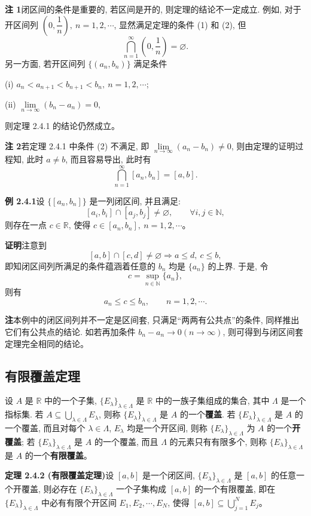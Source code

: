 \documentclass[UTF8,12pt,a4paper,fontset=fandol]{ctexart}
\begin{document}
\noindent\textbf{注 1}\quad 闭区间的条件是重要的, 若区间是开的, 则定理的结论不一定成立. 例如, 对于开区间列 $\left(0,\dfrac1n\right),\ n=1,2,\cdots$, 显然满足定理的条件 (1) 和 (2), 但
\[
  \bigcap_{n=1}^\infty\left(0,\frac1n\right)=\varnothing.
\]
另一方面, 若开区间列 $\{(a_n,b_n)\}$ 满足条件

(i) $a_n<a_{n+1}<b_{n+1}<b_n,\ n=1,2,\cdots$;

(ii) $\lim\limits_{n\to\infty}(b_n-a_n)=0$,

则定理 2.4.1 的结论仍然成立。

\noindent\textbf{注 2}\quad 若定理 2.4.1 中条件 (2) 不满足, 即 $\lim\limits_{n\to\infty}(a_n-b_n)\ne0$, 则由定理的证明过程知, 此时 $a\ne b$, 而且容易导出, 此时有
\[
  \bigcap_{n=1}^\infty [a_n,b_n]=[a,b].
\]

\noindent\textbf{例 2.4.1}\quad 设 $\{[a_n,b_n]\}$ 是一列闭区间, 并且满足:
\[
  [a_i,b_i]\cap[a_j,b_j]\ne\varnothing,\qquad \forall i,j\in\mathbb{N},
\]
则存在一点 $c\in\mathbb{R}$, 使得 $c\in[a_n,b_n],\ n=1,2,\cdots$。

\noindent\textbf{证明}\quad 注意到
\[
  [a,b]\cap[c,d]\ne\varnothing\Rightarrow a\leqslant d,\ c\leqslant b,
\]
即知闭区间列所满足的条件蕴涵着任意的 $b_n$ 均是 $\{a_n\}$ 的上界. 于是, 令
\[
  c=\sup_{n\in\mathbb{N}}\{a_n\},
\]
则有
\[
  a_n\leqslant c\leqslant b_n,\qquad n=1,2,\cdots .
\]

\noindent\textbf{注}\quad 本例中的闭区间列并不一定是区间套, 只满足``两两有公共点''的条件, 同样推出它们有公共点的结论. 如若再加条件 $b_n-a_n\to0(n\to\infty)$, 则可得到与闭区间套定理完全相同的结论。

\subsection{有限覆盖定理}

设 $A$ 是 $\mathbb{R}$ 中的一个子集, $\{E_\lambda\}_{\lambda\in\Lambda}$ 是 $\mathbb{R}$ 中的一族子集组成的集合, 其中 $\Lambda$ 是一个指标集. 若 $A\subseteq\bigcup_{\lambda\in\Lambda}E_\lambda$, 则称 $\{E_\lambda\}_{\lambda\in\Lambda}$ 是 $A$ 的一个\textbf{覆盖}. 若 $\{E_\lambda\}_{\lambda\in\Lambda}$ 是 $A$ 的一个覆盖, 而且对每个 $\lambda\in\Lambda$, $E_\lambda$ 均是一个开区间, 则称 $\{E_\lambda\}_{\lambda\in\Lambda}$ 为 $A$ 的一个\textbf{开覆盖}; 若 $\{E_\lambda\}_{\lambda\in\Lambda}$ 是 $A$ 的一个覆盖, 而且 $\Lambda$ 的元素只有有限多个, 则称 $\{E_\lambda\}_{\lambda\in\Lambda}$ 是 $A$ 的一个\textbf{有限覆盖}。

\noindent\textbf{定理 2.4.2 (有限覆盖定理)}\quad 设 $[a,b]$ 是一个闭区间, $\{E_\lambda\}_{\lambda\in\Lambda}$ 是 $[a,b]$ 的任意一个开覆盖, 则必存在 $\{E_\lambda\}_{\lambda\in\Lambda}$ 一个子集构成 $[a,b]$ 的一个有限覆盖, 即在 $\{E_\lambda\}_{\lambda\in\Lambda}$ 中必有有限个开区间 $E_1,E_2,\cdots,E_N$, 使得 $[a,b]\subseteq\bigcup\limits_{j=1}^N E_j$。
\end{document}
